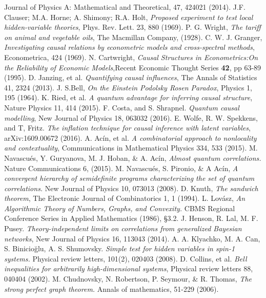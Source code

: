 \documentclass[letterpaper]{article}
\begin{document}
\begin{thebibliography}{}
         Journal of Physics A: Mathematical and Theoretical, 47, 424021
         (2014).
       J.F. Clauser; M.A. Horne; A. Shimony; R.A. Holt, {\em Proposed experiment to test local hidden-variable theories}, Phys. Rev. Lett. 23, 880 (1969).
     P. G. Wright, \emph{The tariff on animal and vegetable oils}, The Macmillan Company, (1928).
     C. W. J. Granger, \emph{Investigating causal relations by econometric models and cross-spectral methods}, Econometrica, 424 (1969).
     N. Cartwright, \emph{Causal Structures in Econometrics:On the Reliability of Economic Models},Recent Economic Thought Series \textbf{42}, pp 63-89 (1995).
          D. Janzing, et al. {\em Quantifying causal influences}, The Annals of Statistics 41, 2324 (2013).
      J. S.Bell, {\em On the Einstein Podolsky Rosen Paradox}, Physics 1, 195 (1964).
     K. Ried, et al. {\em A quantum advantage for inferring causal structure}, Nature Physics 11, 414 (2015).
       F. Costa, and S. Shrapnel. {\em Quantum causal modelling}, New Journal of Physics 18, 063032 (2016).
      E. Wolfe, R. W. Spekkens, and T, Fritz. {\em The inflation technique for causal inference with latent variables}, arXiv:1609.00672 (2016). 
     A. Acín, et al. {\em A combinatorial approach to nonlocality and contextuality}, Communications in Mathematical Physics 334, 533 (2015).
      M. Navascués, Y. Guryanova, M. J. Hoban, \& A. Acín, {\em Almost quantum correlations.}
         Nature Communications 6, (2015).
      M. Navascués, S. Pironio, \& A Acín, 
         {\em A convergent hierarchy of semidefinite programs characterizing the
         set of quantum correlations.}
         New Journal of Physics 10, 073013 (2008).
    D. Knuth, {\em The sandwich theorem}, The Electronic Journal of Combinatorics 1, 1 (1994).
      L. Lovász, 
         {\em An Algorithmic Theory of Numbers, Graphs, and Convexity.}
         CBMS Regional Conference Series in Applied Mathematics (1986), §3.2.
  J. Henson, R. Lal, M. F. Pusey. {\em Theory-independent limits on correlations from generalized Bayesian networks}, New Journal of Physics 16, 113043 (2014).
    A. A. Klyachko, M. A. Can, S. Binicioğlu, A. S. Shumovsky. {\em Simple test for hidden variables in spin-1 systems.}
         Physical review letters, 101(2), 020403 (2008).
    D. Collins, et al. {\em Bell inequalities for arbitrarily high-dimensional systems}, Physical review letters 88, 040404 (2002).
      M. Chudnovsky, N. Robertson, P. Seymour, \& R. Thomas, 
         {\em The strong perfect graph theorem.} 
         Annals of mathematics, 51-229 (2006).
         


\end{thebibliography}
\end{document}
